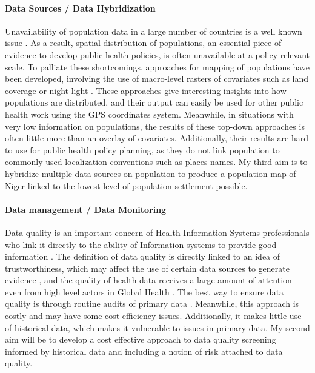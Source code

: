 \paragraph{Data Sources / Data Hybridization} Unavailability of population data in a large number of countries is a well known issue \cite{mahapatra_civil_2007,mikkelsen_global_2015}. As a result, spatial distribution of populations, an essential piece of evidence to develop public health policies, is often unavailable at a policy relevant scale. To palliate these shortcomings, approaches for mapping of populations have been developed, involving the use of macro-level rasters of covariates such as land coverage or night light \cite{linard_population_2012,stevens_disaggregating_2015}. These approaches give interesting insights into how populations are distributed, and their output can easily be used for other public health work using the GPS coordinates system. Meanwhile, in situations with very low information on populations, the results of these top-down approaches is often little more than an overlay of covariates. Additionally, their results are hard to use for public health policy planning, as they do not link population to commonly used localization conventions such as places names. My third aim is to hybridize multiple data sources on population to produce a population map of Niger linked to the lowest level of population settlement possible.

\paragraph{Data management / Data Monitoring} Data quality is an important concern of Health Information Systems professionals \cite{shrestha_data_2000} who link it directly to the ability of Information systems to provide good information \cite{mphatswe_improving_2012}. The definition of data quality is directly linked to an idea of trustworthiness, which may affect the use of certain data sources to generate evidence \cite{gimbel_assessment_2011}, and the quality of health data receives a large amount of attention even from high level actors in Global Health \cite{abou-zahr_better_2010,lopez_better_2015}. The best way to ensure data quality is through routine audits of primary data \cite{ronveaux_immunization_2005}. Meanwhile, this approach is costly and may have some cost-efficiency issues. Additionally, it makes little use of historical data, which makes it vulnerable to issues in primary data. My second aim will be to develop a cost effective approach to data quality screening informed by historical data and including a notion of risk attached to data quality.

